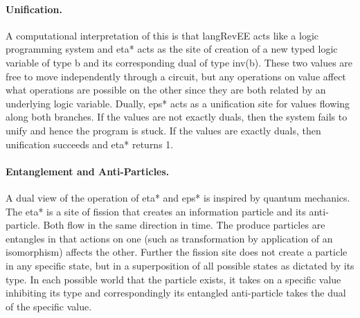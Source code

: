 \documentclass[preprint]{sigplanconf}
\begin{document}
{\begin{multicols}{2}
\begin{center}
\end{center}

\begin{center}
\end{center}  
\end{multicols}

\paragraph*{Unification.}
A computational interpretation of this is that {{langRevEE}} acts like
a logic programming system and {{eta*}} acts as the site of creation
of a new typed logic variable of type {{b}} and its corresponding dual
of type {{inv(b)}}. These two values are free to move independently
through a circuit, but any operations on value affect what operations
are possible on the other since they are both related by an underlying
logic variable. Dually, {{eps*}} acts as a unification site for values
flowing along both branches. If the values are not exactly duals, then
the system fails to unify and hence the program is stuck. If the
values are exactly duals, then unification succeeds and {{eta*}}
returns {{1}}.

\paragraph*{Entanglement and Anti-Particles.}
A dual view of the operation of {{eta*}} and {{eps*}} is inspired by
quantum mechanics. The {{eta*}} is a site of fission that creates an
information particle and its anti-particle. Both flow in the same
direction in time. The produce particles are entangles in that actions
on one (such as transformation by application of an isomorphism)
affects the other. Further the fission site does not create a particle
in any specific state, but in a superposition of all possible states
as dictated by its type. In each possible world that the particle
exists, it takes on a specific value inhibiting its type and
correspondingly its entangled anti-particle takes the dual of the
specific value.

}
\end{document}

